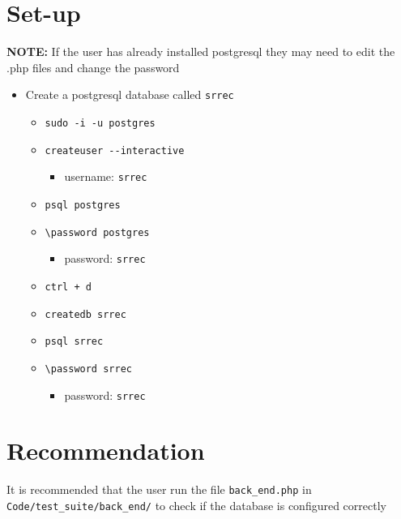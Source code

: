 \documentclass[10pt, a4paper, onecolumn]{scrartcl}
\providecommand{\tightlist}{%
	\setlength{\itemsep}{0pt}\setlength{\parskip}{0pt}}
\begin{document}
	\section{Set-up}
	
	\textbf{NOTE:} If the user has already installed postgresql they may
	need to edit the .php files and change the password
	
	\begin{itemize}
		\tightlist
		\item
		Create a postgresql database called \texttt{srrec}
		
		\begin{itemize}
			\tightlist
			\item
			\texttt{sudo\ -i\ -u\ postgres}
			\item
			\texttt{createuser\ -\/-interactive}
			
			\begin{itemize}
				\tightlist
				\item
				username: \texttt{srrec}
			\end{itemize}
			\item
			\texttt{psql\ postgres}
			\item
			\texttt{\textbackslash{}password\ postgres}
			
			\begin{itemize}
				\tightlist
				\item
				password: \texttt{srrec}
			\end{itemize}
			\item
			\texttt{ctrl\ +\ d}
			\item
			\texttt{createdb\ srrec}
			\item
			\texttt{psql\ srrec}
			\item
			\texttt{\textbackslash{}password\ srrec}
			
			\begin{itemize}
				\tightlist
				\item
				password: \texttt{srrec}
			\end{itemize}
		\end{itemize}
	\end{itemize}
	
	\section{Recommendation}
	
	It is recommended that the user run the file \texttt{back\_end.php} in
	\texttt{Code/test\_suite/back\_end/} to check if the database is configured
	correctly
	
\end{document}
